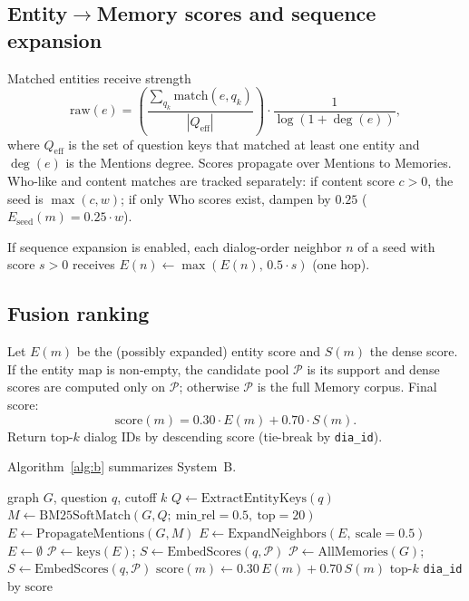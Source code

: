 \documentclass[11pt]{article}
\begin{document}
\subsection{Entity$\rightarrow$Memory scores and sequence expansion}
\label{sec:seeds}

Matched entities receive strength
\begin{equation}
\mathrm{raw}(e)=\left(\frac{\sum_{q_k}\mathrm{match}(e,q_k)}{|Q_{\mathrm{eff}}|}\right)\cdot\frac{1}{\log(1+\deg(e))},
\end{equation}
where $Q_{\mathrm{eff}}$ is the set of question keys that matched at least one entity and $\deg(e)$ is the Mentions degree.
Scores propagate over Mentions to Memories.
Who-like and content matches are tracked separately: if content score $c>0$, the seed is $\max(c,w)$; if only Who scores exist, dampen by $0.25$ ($E_{\mathrm{seed}}(m)=0.25\cdot w$).

If sequence expansion is enabled, each dialog-order neighbor $n$ of a seed with score $s>0$ receives
$E(n)\leftarrow\max(E(n),\,0.5\cdot s)$
(one hop).

\subsection{Fusion ranking}
\label{sec:fusion}

Let $E(m)$ be the (possibly expanded) entity score and $S(m)$ the dense score.
If the entity map is non-empty, the candidate pool $\mathcal{P}$ is its support and dense scores are computed only on $\mathcal{P}$; otherwise $\mathcal{P}$ is the full Memory corpus.
Final score:
\begin{equation}
\mathrm{score}(m)=0.30\cdot E(m)+0.70\cdot S(m).
\end{equation}
Return top-$k$ dialog IDs by descending score (tie-break by \texttt{dia\_id}).

Algorithm~\ref{alg:b} summarizes System~B.

\begin{algorithm}[t]
\caption{EM fusion retrieval (System B)}
\label{alg:b}
\begin{algorithmic}[1]
\Require graph $G$, question $q$, cutoff $k$
\State $Q \gets \mathrm{ExtractEntityKeys}(q)$ 
  \State $M \gets \mathrm{BM25SoftMatch}(G,Q;\ \mathrm{min\_rel}{=}0.5,\ \mathrm{top}{=}20)$
  \State $E \gets \mathrm{PropagateMentions}(G,M)$ 
  \State $E \gets \mathrm{ExpandNeighbors}(E,\ \mathrm{scale}{=}0.5)$ 
\Else
  \State $E \gets \emptyset$
\EndIf
{}
  \State $\mathcal{P} \gets \mathrm{keys}(E)$;\; $S \gets \mathrm{EmbedScores}(q,\mathcal{P})$
\Else
  \State $\mathcal{P} \gets \mathrm{AllMemories}(G)$;\; $S \gets \mathrm{EmbedScores}(q,\mathcal{P})$
\EndIf
{}
  \State $\mathrm{score}(m) \gets 0.30\,E(m)+0.70\,S(m)$
\EndFor
\State \Return top-$k$ \texttt{dia\_id} by $\mathrm{score}$
\end{algorithmic}
\end{algorithm}
\end{document}
